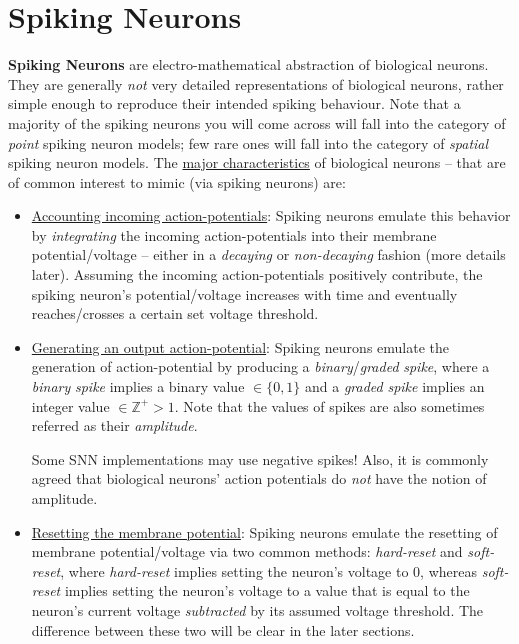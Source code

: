 \section{Spiking Neurons}
\textbf{Spiking Neurons} are electro-mathematical abstraction of biological neurons. They are generally \textit{not} very detailed representations of biological neurons, rather simple enough to reproduce their intended spiking behaviour. Note that a majority of the spiking neurons you will come across will fall into the category of \textsl{point} spiking neuron models; few rare ones will fall into the category of \textsl{spatial} spiking neuron models. The \ul{major characteristics} of biological neurons -- that are of common interest to mimic (via spiking neurons) are:
\begin{itemize}
    \item \ul{Accounting incoming action-potentials}: %
    Spiking neurons emulate this behavior by \textit{integrating} the incoming action-potentials into their membrane potential/voltage -- either in a \textit{decaying} or \textit{non-decaying} fashion (more details later). Assuming the incoming action-potentials positively contribute, the spiking neuron's potential/voltage increases with time and eventually reaches/crosses a certain set voltage threshold.
    \vspace{5pt}
    
    \item \ul{Generating an output action-potential}: %
    Spiking neurons emulate the generation of action-potential by %
    producing a \textit{binary}/\textit{graded} \textsl{spike}, where a \textit{binary} \textsl{spike} implies a binary value $\in \{0, 1\}$ and a \textit{graded} \textsl{spike} implies an integer value $\in \mathbb{Z}^+ > 1$. Note that the values of spikes are also sometimes referred as their \textit{amplitude}.
    \begin{remark}
        Some SNN implementations may use negative spikes! Also, it is commonly agreed that biological neurons' action potentials do \textit{not} have the notion of amplitude.
    \end{remark}
    \vspace{5pt}
    
    \item \ul{Resetting the membrane potential}: Spiking neurons emulate the resetting of membrane potential/voltage via two common methods: \textsl{hard-reset} and \textsl{soft-reset}, %
    where \textsl{hard-reset} implies setting the neuron's voltage to $0$, whereas \textsl{soft-reset} implies setting the neuron's voltage to a value that is equal to the neuron's current voltage \textit{subtracted} by its assumed voltage threshold. The difference between these two will be clear in the later sections.
    \vspace{5pt}
    

\end{itemize}

